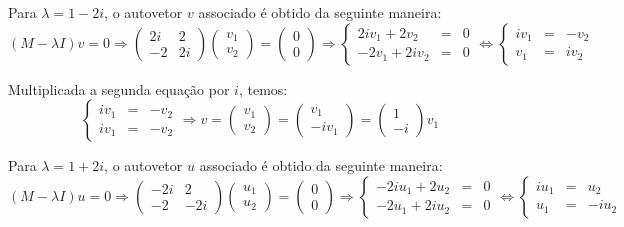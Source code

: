 Para $\lambda = 1-2i$, o autovetor $v$ associado é obtido da seguinte maneira: 
$$
(M-\lambda I) v = 0 \Rightarrow  
\left(\begin{array}{cc} 2i & 2 \\ -2 & 2i \end{array}\right)
\left(\begin{array}{c} v_1 \\ v_2 \end{array}\right)
= 
\left(\begin{array}{c} 0 \\ 0 \end{array}\right)
\Rightarrow  
\left\{
\begin{array}{rcl}
2iv_1 + 2v_2 &=& 0 \\
-2v_1 + 2iv_2 &=& 0 
\end{array}\right.
\Leftrightarrow  
\left\{
\begin{array}{rcl}
iv_1 &=& -v_2 \\
v_1 &=& iv_2
\end{array}\right.
$$

Multiplicada a segunda equação por $i$, temos:
$$\left\{
\begin{array}{rcl}
iv_1 &=& -v_2 \\
iv_1 &=& -v_2
\end{array}\right.
\Rightarrow
v = 
\left(\begin{array}{c} v_1 \\ v_2 \end{array}\right)
= 
\left(\begin{array}{c} v_1 \\ -iv_1 \end{array}\right)
= 
\left(\begin{array}{c} 1 \\ -i \end{array}\right) v_1
$$




Para $\lambda = 1+2i$, o autovetor $u$ associado é obtido da seguinte maneira: 
$$
(M-\lambda I) u = 0 \Rightarrow  
\left(\begin{array}{cc} -2i & 2 \\ -2 & -2i \end{array}\right)
\left(\begin{array}{c} u_1 \\ u_2 \end{array}\right)
= 
\left(\begin{array}{c} 0 \\ 0 \end{array}\right)
\Rightarrow  
\left\{
\begin{array}{rcl}
-2iu_1 + 2u_2 &=& 0 \\
-2u_1 + 2iu_2 &=& 0 
\end{array}\right.
\Leftrightarrow  
\left\{
\begin{array}{rcl}
iu_1 &=& u_2 \\
u_1 &=& -iu_2
\end{array}\right.
$$

